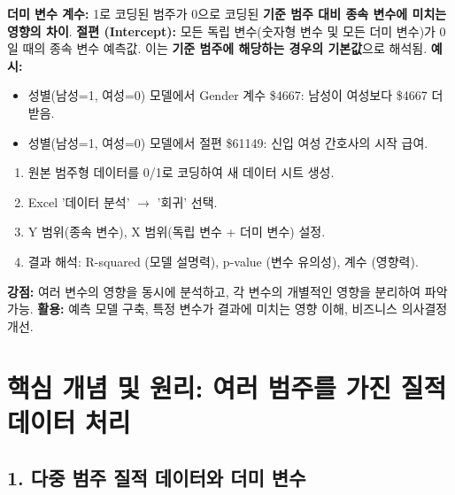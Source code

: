 \documentclass[11pt,a4paper]{article}
\theoremstyle{definition}
\begin{document}
\begin{tcolorbox}[colback=orange!5!white, colframe=orange!75!black, title=\textbf{회귀 계수 및 절편 해석}]
\textbf{더미 변수 계수:} 1로 코딩된 범주가 0으로 코딩된 \textbf{기준 범주 대비 종속 변수에 미치는 영향의 차이}.
\textbf{절편 (Intercept):} 모든 독립 변수(숫자형 변수 및 모든 더미 변수)가 0일 때의 종속 변수 예측값. 이는 \textbf{기준 범주에 해당하는 경우의 기본값}으로 해석됨.
\textbf{예시:}
\begin{itemize}
    \item 성별(남성=1, 여성=0) 모델에서 Gender 계수 \$4667: 남성이 여성보다 \$4667 더 받음.
    \item 성별(남성=1, 여성=0) 모델에서 절편 \$61149: 신입 여성 간호사의 시작 급여.
\end{itemize}
\end{tcolorbox}

\begin{tcolorbox}[colback=teal!5!white, colframe=teal!75!black, title=\textbf{Excel 활용 절차}]
\begin{enumerate}
    \item 원본 범주형 데이터를 0/1로 코딩하여 새 데이터 시트 생성.
    \item Excel '데이터 분석' $\rightarrow$ '회귀' 선택.
    \item Y 범위(종속 변수), X 범위(독립 변수 + 더미 변수) 설정.
    \item 결과 해석: R-squared (모델 설명력), p-value (변수 유의성), 계수 (영향력).
\end{enumerate}
\end{tcolorbox}

\begin{tcolorbox}[colback=gray!5!white, colframe=gray!75!black, title=\textbf{회귀 분석의 가치}]
\textbf{강점:} 여러 변수의 영향을 동시에 분석하고, 각 변수의 개별적인 영향을 분리하여 파악 가능.
\textbf{활용:} 예측 모델 구축, 특정 변수가 결과에 미치는 영향 이해, 비즈니스 의사결정 개선.
\end{tcolorbox}

\newpage

\section{핵심 개념 및 원리: 여러 범주를 가진 질적 데이터 처리}

\subsection{1. 다중 범주 질적 데이터와 더미 변수}
\end{document}
